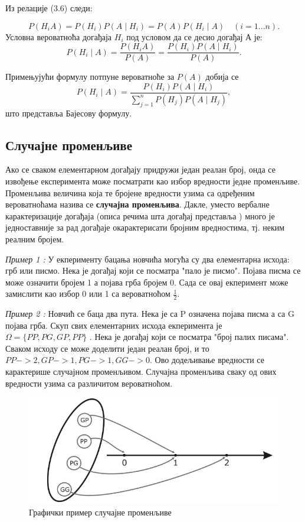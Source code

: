 \begin{dok}
Из релације (3.6) следи:

\begin{equation}
P(H_iA) = P(H_i)P(A \mid H_i) = P(A)P(H_i \mid A) \quad  (i=1...n).
\end{equation}
Условна вероватноћа догађаја $H_i$ под условом да се десио догађај А је:
$$ P(H_i \mid A) = \frac{P(H_iA)}{P(A)} = \frac{P(H_i)P(A \mid H_i) }{P(A)}. $$

Примењујући формулу потпуне вероватноће за $P(A)$  добија се 
$$
 P(H_i \mid A ) = \frac{P(H_i)P(A \mid H_i)}{ \sum_{j=1}^n P(H_j)P(A \mid H_j)},
$$
што представља Бајесову формулу.

\end{dok}

\subsection{Случајне променљиве}

Ако се сваком елементарном догађају придружи један реалан број, онда се извођење експеримента може посматрати као избор вредности једне променљиве. Променљива величина која те бројене вредности узима са одређеним вероватноћама назива се \textbf{случајна променљива}. Дакле, уместо вербалне карактеризације догађаја (описа речима шта догађај представља ) много је једноставније за рад догађаје окарактерисати бројним вредностима, тј. неким реалним бројем.

\textit{Пример 1 :} У екперименту бацања новчића могућа су два елементарна исхода: грб или писмо. Нека је догађај који се посматра "пало је писмо". Појава писма се може означити бројем 1 а појава грба бројем 0. Сада се овај екперимент може замислити као избор 0 или 1 са вероватноћом $\frac{1}{2}$.

\textit{Пример 2 :} Новчић се баца два пута. Нека је са P означена појава писма а са G појава грба. Скуп свих елементарних исхода екперимента је $ \Omega = \lbrace PP, PG, GP, PP \rbrace$ . Нека је догађај који се посматра "број палих писама". Сваком исходу се може доделити један реалан број, и то $ PP -> 2, GP -> 1,PG -> 1, GG ->0$. Ово додељивање вредности се карактерише случајном променљивом.  Случајна променљива сваку од ових вредности узима са различитом вероватноћом.

\begin{figure}[H]
    \centering
   \includegraphics[scale=0.5]{./Slike/slika12.png} 
	\caption{Графички пример случајне променљиве}
	\label{fig:slika12}
\end{figure}

